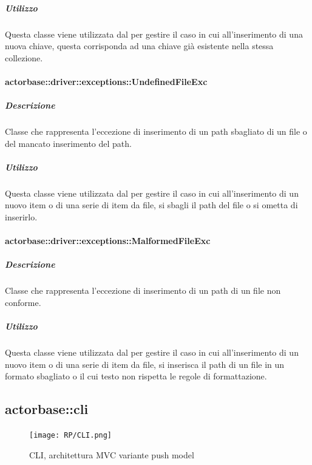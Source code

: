 \documentclass{scalatekids-article}
\begin{document}
\subparagraph{Utilizzo}

Questa classe viene utilizzata dal  per gestire il caso in cui all'inserimento di una nuova chiave, questa corrisponda ad una chiave già esistente nella stessa collezione.

\paragraph{actorbase::driver::exceptions::UndefinedFileExc}

\subparagraph{Descrizione}

Classe che rappresenta l'eccezione di inserimento di un path sbagliato di un file o del mancato inserimento del path.

\subparagraph{Utilizzo}

Questa classe viene utilizzata dal  per gestire il caso in cui all'inserimento di un nuovo item o di una serie di item da file, si sbagli il path del file o si ometta di inserirlo.

\paragraph{actorbase::driver::exceptions::MalformedFileExc}

\subparagraph{Descrizione}

Classe che rappresenta l'eccezione di inserimento di un path di un file non conforme.

\subparagraph{Utilizzo}

Questa classe viene utilizzata dal  per gestire il caso in cui all'inserimento di un nuovo item o di una serie di item da file, si inserisca il path di un file in un formato sbagliato o il cui testo non rispetta le regole di formattazione.



\subsection{actorbase::cli}
\label{sec:actorbase::cli}

\begin{figure}[H]
	\begin{center}
		\texttt{[image: RP/CLI.png]}
		\caption{CLI, architettura MVC variante push model}
	\end{center}
\end{figure}
\end{document}
